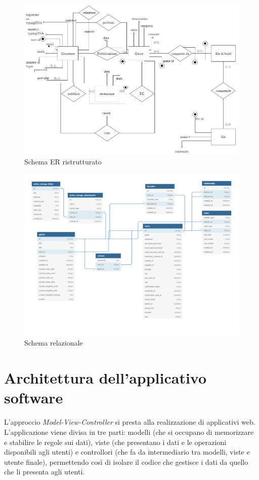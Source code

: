 \begin{figure}[hbt!]
    \centering
    \includegraphics[angle=-90, width=\textwidth]{schemaER_ristrutturato}
    \caption{Schema ER ristrutturato}
\end{figure}

\begin{figure}[hbt!]
    \centering
    \includegraphics[angle=-90, width=\textwidth]{schema_relazionale}
    \caption{Schema relazionale}
\end{figure}

\FloatBarrier
\section{Architettura dell'applicativo software}
L'approccio \emph{Model-View-Controller} si presta alla realizzazione di applicativi web.\cite{ProgSoft} L'applicazione viene divisa in tre parti: modelli (che si occupano di memorizzare e stabilire le regole sui dati), viste (che presentano i dati e le operazioni disponibili agli utenti) e controllori (che fa da intermediario tra modelli, viste e utente finale), permettendo così di isolare il codice che gestisce i dati da quello che li presenta agli utenti.\\

